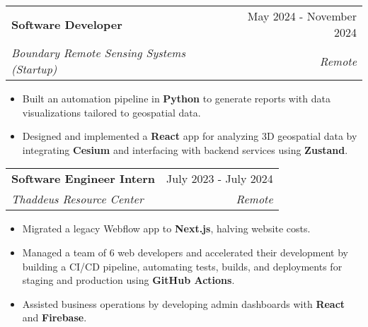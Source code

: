 \documentclass[letterpaper,11pt]{article}
\makeatletter
\newcommand{\Item}[1]{
  \item\setstretch{.95}\small{
    {#1 \vspace{-2pt}}
  }
}
\newcommand{\Subheading}[4]{
  \vspace{-2pt}\item
    \begin{tabular*}{0.97\textwidth}[t]{l@{\extracolsep{\fill}}r}
      \textbf{#1} & #2 \\
      \textit{\small#3} & \textit{\small #4} \\
    \end{tabular*}\vspace{-4.8pt}
}
\newcommand{\ItemListStart}{\begin{itemize}}
\newcommand{\ItemListEnd}{\end{itemize}\vspace{-5pt}}
\makeatother
\begin{document}
\Subheading
{Software Developer}{May 2024 - November 2024}
{Boundary Remote Sensing Systems (Startup)}{Remote}
\ItemListStart
\Item{Built an automation pipeline in \textbf{Python} to generate reports with data visualizations tailored to geospatial data.}
\Item{Designed and implemented a \textbf{React} app for analyzing 3D geospatial data by integrating \textbf{Cesium} and interfacing with backend services using \textbf{Zustand}.}
\ItemListEnd


\Subheading
{Software Engineer Intern}{July 2023 - July 2024}
{Thaddeus Resource Center}{Remote}
\ItemListStart
\Item{Migrated a legacy Webflow app to \textbf{Next.js}, halving website costs.}
\Item{Managed a team of 6 web developers and accelerated their development by building a CI/CD pipeline, automating tests, builds, and deployments for staging and production using \textbf{GitHub Actions}.}
\Item{Assisted business operations by developing admin dashboards with \textbf{React} and \textbf{Firebase}.}
\ItemListEnd
\end{document}

